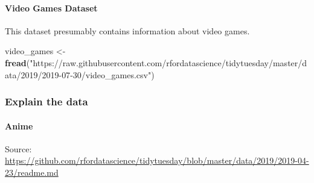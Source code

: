 \documentclass[
  b5paper]{book}
\newenvironment{Shaded}{\begin{snugshade}}{\end{snugshade}}
\newcommand{\FunctionTok}[1]{\textcolor[rgb]{0.13,0.29,0.53}{\textbf{#1}}}
\newcommand{\NormalTok}[1]{#1}
\newcommand{\OtherTok}[1]{\textcolor[rgb]{0.56,0.35,0.01}{#1}}
\newcommand{\StringTok}[1]{\textcolor[rgb]{0.31,0.60,0.02}{#1}}
\begin{document}
\hypertarget{video-games-dataset}{%
\paragraph{Video Games Dataset}\label{video-games-dataset}}

This dataset presumably contains information about video games.

\begin{Shaded}
\begin{Highlighting}[]
\NormalTok{video\_games }\OtherTok{\textless{}{-}} \FunctionTok{fread}\NormalTok{(}\StringTok{"https://raw.githubusercontent.com/rfordatascience/tidytuesday/master/data/2019/2019{-}07{-}30/video\_games.csv"}\NormalTok{)}
\end{Highlighting}
\end{Shaded}

\hypertarget{explain-the-data}{%
\subsubsection*{Explain the data}\label{explain-the-data}}

\hypertarget{anime}{%
\paragraph*{Anime}\label{anime}}

Source: \url{https://github.com/rfordatascience/tidytuesday/blob/master/data/2019/2019-04-23/readme.md}
\end{document}
